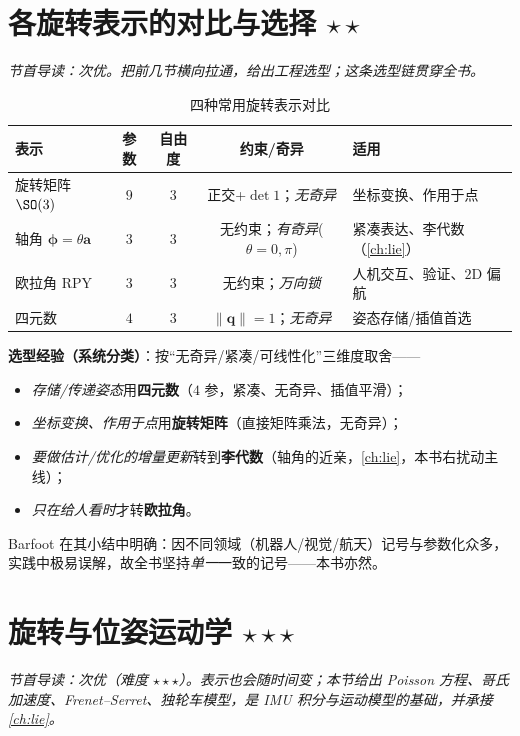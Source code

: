 \section{各旋转表示的对比与选择 \texorpdfstring{$\star\star$}{**}}
\label{sec:rb-compare}
\noindent\emph{节首导读：次优。把前几节横向拉通，给出工程选型；这条选型链贯穿全书。}

\begin{table}[H]\centering\small
\caption{四种常用旋转表示对比}
\label{tab:rb-compare}
\begin{tabular}{lcccl}
\toprule
表示 & 参数 & 自由度 & 约束/奇异 & 适用 \\
\midrule
旋转矩阵 $\SO(3)$ & $9$ & $3$ & 正交+$\det1$；\emph{无奇异} & 坐标变换、作用于点 \\
轴角 $\boldsymbol{\phi}=\theta\mathbf{a}$ & $3$ & $3$ & 无约束；\emph{有奇异}($\theta=0,\pi$) & 紧凑表达、李代数（\cref{ch:lie}）\\
欧拉角 RPY & $3$ & $3$ & 无约束；\emph{万向锁} & 人机交互、验证、$2$D 偏航 \\
四元数 & $4$ & $3$ & $\|\mathbf{q}\|=1$；\emph{无奇异} & 姿态存储/插值首选 \\
\bottomrule
\end{tabular}
\end{table}

\noindent\textbf{选型经验（系统分类）}：按“无奇异/紧凑/可线性化”三维度取舍——
\begin{itemize}
  \item \emph{存储/传递姿态}用\textbf{四元数}（$4$ 参，紧凑、无奇异、插值平滑）；
  \item \emph{坐标变换、作用于点}用\textbf{旋转矩阵}（直接矩阵乘法，无奇异）；
  \item \emph{要做估计/优化的增量更新}转到\textbf{李代数}（轴角的近亲，\cref{ch:lie}，本书右扰动主线）；
  \item \emph{只在给人看时}才转\textbf{欧拉角}。
\end{itemize}
Barfoot 在其小结中明确：因不同领域（机器人/视觉/航天）记号与参数化众多，实践中极易误解，故全书坚持\emph{单一}一致的记号——本书亦然\cite{barfoot2024state}。

\section{旋转与位姿运动学 \texorpdfstring{$\star\star\star$}{***}}
\label{sec:rb-kinematics}
\noindent\emph{节首导读：次优（难度 $\star\star\star$）。表示也会随时间变；本节给出 Poisson 方程、哥氏加速度、Frenet--Serret、独轮车模型，是 IMU 积分与运动模型的基础，并承接 \cref{ch:lie}。}


